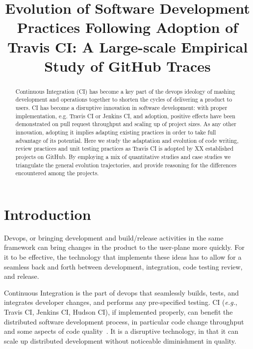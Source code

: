\documentclass[conference]{IEEEtran}
\newcommand{\eg}{{\emph{e.g.}},\xspace}
\begin{document}
\title{Evolution of Software Development Practices
Following Adoption of Travis CI: A Large-scale Empirical Study of GitHub Traces}

\author
{\IEEEauthorblockN{}
\IEEEauthorblockA{}
}
\maketitle
\begin{abstract}
Continuous Integration (CI) has become a key part of the devops ideology of mashing development and operations together to shorten the cycles of delivering a product to users. CI has become a disruptive innovation in software development: with proper implementation, e.g. Travis CI or Jenkins CI, and adoption, positive effects have been demonstrated on pull request throughput and scaling up of project sizes. As any other innovation, adopting it implies adapting existing practices in order to take full advantage of its potential. Here we study the adaptation and evolution of code writing, review practices and unit testing practices as Travis CI is adopted by XX established projects on GitHub. By employing a mix of quantitative studies and case studies we triangulate the general evolution trajectories, and provide reasoning for the differences encountered among the projects.
\end{abstract}

\section{Introduction}
Devops, or bringing development and build/release activities in the same framework can bring changes in the product to the user-plane more quickly. For it to be effective, the technology that implements these ideas has to allow for a seamless back and forth between development, integration, code testing review, and release. 

Continuous Integration is the part of devops that seamlessly builds, tests, and integrates developer changes, and performs any pre-specified testing. CI (\eg Travis CI, Jenkins CI, Hudson CI), if implemented properly, can benefit the distributed software development process, in particular code change throughput~\cite{Stolberg} and some aspects of code quality~\cite{VasilescuYWDF15}. It is a disruptive technology, in that it can scale up distributed development without noticeable diminishment in quality.
\end{document}
